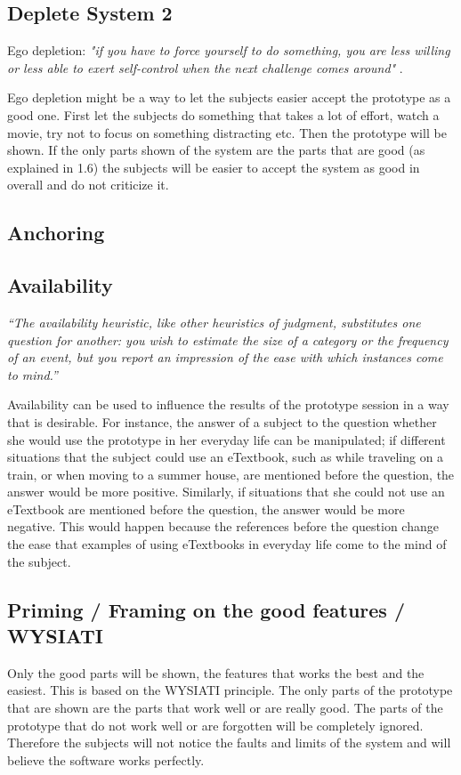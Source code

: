 \documentclass{article}
\begin{document}
\subsection{Deplete System 2}
Ego depletion:\emph{ "if you have to force yourself to do something, you are less willing
or less able to exert self-control when the next challenge comes around" }.

Ego depletion might be a way to let the subjects easier accept the prototype
as a good one. First let the subjects do something that takes a lot of effort, watch
a movie, try not to focus on something distracting etc. Then the prototype will
be shown. If the only parts shown of the system are the parts that are good
(as explained in 1.6) the subjects will be easier to accept the system as good in
overall and do not criticize it.

\subsection{Anchoring}

\subsection{Availability}
\emph{``The availability heuristic, like other heuristics of judgment, substitutes one question for another: you wish to estimate the size of a category or the frequency of an event, but you report an impression of the ease with which instances come to mind.''}

Availability can be used to influence the results of the prototype session in a way that is desirable. For instance, the answer of a subject to the question whether she would use the prototype in her everyday life can be manipulated; if different situations that the subject could use an eTextbook, such as while traveling on a train, or when moving to a summer house, are mentioned before the question, the answer would be more positive. Similarly,  if situations that she could not use an eTextbook are mentioned before the question, the answer would be more negative. This would happen because the references before the question change the ease that examples of using eTextbooks in everyday life come to the mind of the subject.

\subsection{Priming / Framing on the good features / WYSIATI}
Only the good parts will be shown, the features that works the best and the easiest.
This is based on the WYSIATI principle. The only parts of the prototype
that are shown are the parts that work well or are really good. The parts of
the prototype that do not work well or are forgotten will be completely ignored.
Therefore the subjects will not notice the faults and limits of the system
and will believe the software works perfectly.
\end{document}
